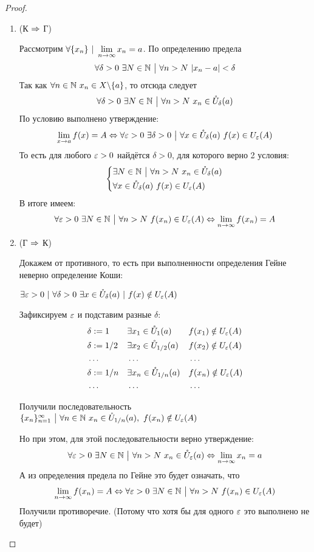 \begin{proof}
	\begin{enumerate}
		\item (К $\Rightarrow$ Г)
		
		Рассмотрим $\forall \{x_n\}\ |\ \lim\limits_{n \to \infty} x_n = a$. По определению предела
		$$
			\forall \delta > 0\ \exists N \in \N\ \big|\ \forall n > N\ |x_n - a| < \delta
		$$
		Так как $\forall n \in \mathbb{N}\ x_n \in X \backslash \{a\}$, то отсюда следует
		$$
			\forall \delta > 0\ \exists N \in \N\ \big|\ \forall n > N\ x_n \in \mc{U}_{\delta}(a)
		$$
		По условию выполнено утверждение:
		$$
			\lim\limits_{x \to a} f(x) = A \Leftrightarrow \forall \varepsilon > 0\ \exists \delta > 0\ \big|\ \forall x \in \mathring{U}_{\delta}(a)\ f(x) \in U_{\varepsilon}(A)
		$$
		То есть для любого $\varepsilon > 0$ найдётся $\delta > 0$, для которого верно 2 условия:
		$$
		\left\{\begin{aligned}
			&{\exists N \in \mathbb{N}\ \big|\ \forall n > N\ x_n \in \mathring{U}_{\delta}(a)}
			\\
			&{\forall x \in \mathring{U}_{\delta}(a)\ f(x) \in U_{\varepsilon}(A)}
		\end{aligned}\right.
		$$
		В итоге имеем:
		$$
			\forall \varepsilon > 0\ \exists N \in \mathbb{N}\ \big|\ \forall n > N\ f(x_n) \in U_{\varepsilon}(A) \Leftrightarrow \lim\limits_{n \to \infty} f(x_n) = A
		$$
		
		\item (Г $\Rightarrow$ К)
		
		Докажем от противного, то есть при выполненности определения Гейне неверно определение Коши:
		
		$\exists \varepsilon > 0\ |\ \forall \delta > 0\ \exists x \in \mathring{U}_{\delta}(a)\ |\ f(x) \notin U_{\varepsilon}(A)$
		
		Зафиксируем $\varepsilon$ и подставим разные $\delta$:
		\begin{align*}
			&\delta := 1 & &{\exists x_1 \in \mathring{U}_{1}(a)} & &{f(x_1) \notin U_{\varepsilon}(A)}
			\\
			&\delta := 1/2 & &{\exists x_2 \in \mathring{U}_{1/2}(a)} & &{f(x_2) \notin U_{\varepsilon}(A)}
			\\
			&\dots & &\dots & &\dots
			\\
			&\delta := 1/n & &{\exists x_n \in \mathring{U}_{1/n}(a)} & &{f(x_n) \notin U_{\varepsilon}(A)}
			\\
			&\dots & &\dots & &\dots
		\end{align*}
		
		Получили последовательность $\{x_n\}_{n = 1}^\infty\ \big|\ \forall n \in \mathbb{N}\ x_n \in \mathring{U}_{1/n}(a),\ f(x_n) \notin U_{\varepsilon}(A)$
		
		Но при этом, для этой последовательности верно утверждение:
		$$
			\forall \eps > 0\ \exists N \in \N\ \big|\ \forall n > N\ x_n \in \mc{U}_{\eps}(a) \lra \liml_{n \to \infty} x_n = a
		$$
		А из определения предела по Гейне это будет означать, что
		$$
			\lim\limits_{n \to \infty} f(x_n) = A \Leftrightarrow \forall \varepsilon > 0\ \exists N \in \mathbb{N}\ \big|\ \forall n > N\ f(x_n) \in U_{\varepsilon} (A)
		$$
		Получили противоречие. (Потому что хотя бы для одного $\varepsilon$ это выполнено не будет)
	\end{enumerate}
\end{proof}

